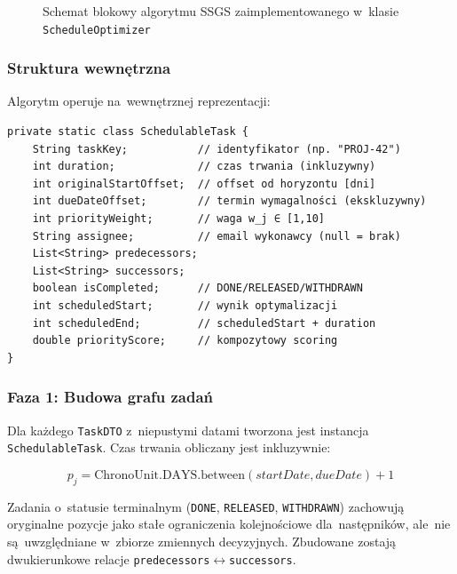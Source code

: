 \begin{figure}[H]
\caption{Schemat blokowy algorytmu SSGS zaimplementowanego w~klasie \texttt{ScheduleOptimizer}}
\label{fig:ssgs_flowchart}
\end{figure}

\subsubsection{Struktura wewnętrzna}

Algorytm operuje na~wewnętrznej reprezentacji:

\begin{verbatim}
private static class SchedulableTask {
    String taskKey;           // identyfikator (np. "PROJ-42")
    int duration;             // czas trwania (inkluzywny)
    int originalStartOffset;  // offset od horyzontu [dni]
    int dueDateOffset;        // termin wymagalności (ekskluzywny)
    int priorityWeight;       // waga w_j ∈ [1,10]
    String assignee;          // email wykonawcy (null = brak)
    List<String> predecessors;
    List<String> successors;
    boolean isCompleted;      // DONE/RELEASED/WITHDRAWN
    int scheduledStart;       // wynik optymalizacji
    int scheduledEnd;         // scheduledStart + duration
    double priorityScore;     // kompozytowy scoring
}
\end{verbatim}

\subsubsection{Faza 1: Budowa grafu zadań}

Dla każdego \texttt{TaskDTO} z~niepustymi datami tworzona jest instancja \texttt{SchedulableTask}. Czas trwania obliczany jest inkluzywnie:

$$p_j = \text{ChronoUnit.DAYS.between}(startDate, dueDate) + 1$$

Zadania o~statusie terminalnym (\texttt{DONE}, \texttt{RELEASED}, \texttt{WITHDRAWN}) zachowują oryginalne pozycje jako stałe ograniczenia kolejnościowe dla~następników, ale~nie są~uwzględniane w~zbiorze zmiennych decyzyjnych. Zbudowane zostają dwukierunkowe relacje \texttt{predecessors}$\leftrightarrow$\texttt{successors}.

